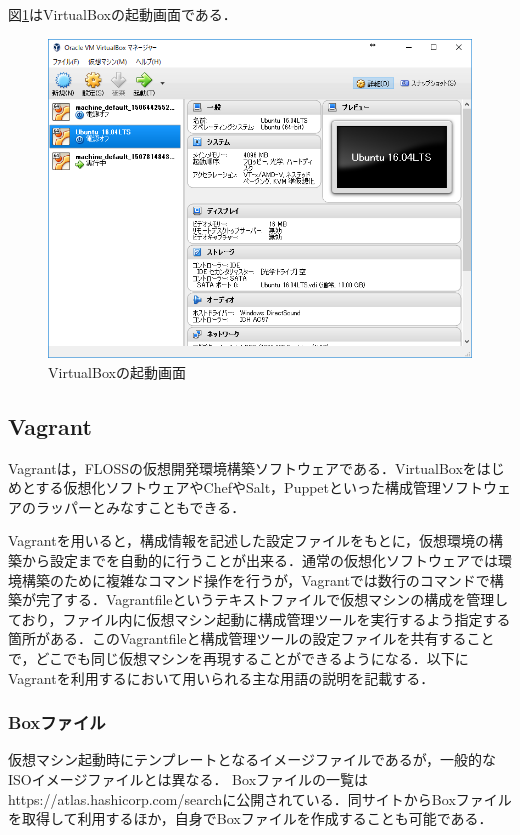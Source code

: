 図\ref{VirtualBox}はVirtualBoxの起動画面である．

\begin{figure}[htb]
\centering
\includegraphics[width=12cm]{images/VirtualBox.png}
\caption{VirtualBoxの起動画面}\label{VirtualBox}
\end{figure}

\newpage
 
\subsection{Vagrant}

Vagrant\cite{vagrant}は，FLOSSの仮想開発環境構築ソフトウェアである．VirtualBoxをはじめとする仮想化ソフトウェアやChefやSalt，Puppetといった構成管理ソフトウェアのラッパーとみなすこともできる．

Vagrantを用いると，構成情報を記述した設定ファイルをもとに，仮想環境の構築から設定までを自動的に行うことが出来る．通常の仮想化ソフトウェアでは環境構築のために複雑なコマンド操作を行うが，Vagrantでは数行のコマンドで構築が完了する．Vagrantfileというテキストファイルで仮想マシンの構成を管理しており，ファイル内に仮想マシン起動に構成管理ツールを実行するよう指定する箇所がある．このVagrantfileと構成管理ツールの設定ファイルを共有することで，どこでも同じ仮想マシンを再現することができるようになる．以下にVagrantを利用するにおいて用いられる主な用語の説明を記載する．

\subsubsection{Boxファイル}

仮想マシン起動時にテンプレートとなるイメージファイルであるが，一般的なISOイメージファイルとは異なる．
Boxファイルの一覧はhttps://atlas.hashicorp.com/searchに公開されている．同サイトからBoxファイルを取得して利用するほか，自身でBoxファイルを作成することも可能である．

